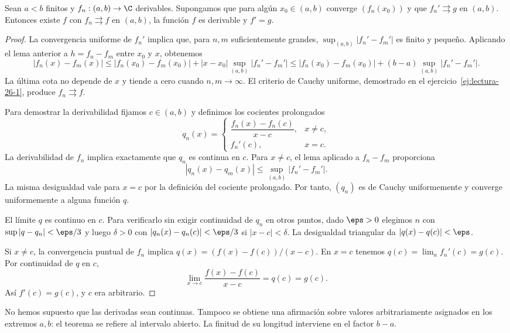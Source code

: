 \begin{teorema}\label{ch26:derivacion}
Sean $a<b$ finitos y $f_n:(a,b)\to\C$ derivables. Supongamos que para algún $x_0\in(a,b)$ converge $(f_n(x_0))$ y que $f_n'\rightrightarrows g$ en $(a,b)$. Entonces existe $f$ con $f_n\rightrightarrows f$ en $(a,b)$, la función $f$ es derivable y $f'=g$.
\end{teorema}
\begin{proof}
La convergencia uniforme de $f_n'$ implica que, para $n,m$ suficientemente grandes, $\sup_{(a,b)}|f_n'-f_m'|$ es finito y pequeño. Aplicando el lema anterior a $h=f_n-f_m$ entre $x_0$ y $x$, obtenemos
\[
 |f_n(x)-f_m(x)|
 \le |f_n(x_0)-f_m(x_0)|+|x-x_0|\sup_{(a,b)}|f_n'-f_m'|
 \le |f_n(x_0)-f_m(x_0)|+(b-a)\sup_{(a,b)}|f_n'-f_m'|.
\]
La última cota no depende de $x$ y tiende a cero cuando $n,m\to\infty$. El criterio de Cauchy uniforme, demostrado en el ejercicio~\ref{ej:lectura-26-1}, produce $f_n\rightrightarrows f$.

Para demostrar la derivabilidad fijamos $c\in(a,b)$ y definimos los cocientes prolongados
\[
 q_n(x)=\begin{cases}
 \dfrac{f_n(x)-f_n(c)}{x-c},&x\ne c,\\[4pt]
 f_n'(c),&x=c.
 \end{cases}
\]
La derivabilidad de $f_n$ implica exactamente que $q_n$ es continua en $c$. Para $x\ne c$, el lema aplicado a $f_n-f_m$ proporciona
\[
 |q_n(x)-q_m(x)|\le\sup_{(a,b)}|f_n'-f_m'|.
\]
La misma desigualdad vale para $x=c$ por la definición del cociente prolongado. Por tanto, $(q_n)$ es de Cauchy uniformemente y converge uniformemente a alguna función $q$.

El límite $q$ es continuo en $c$. Para verificarlo sin exigir continuidad de $q_n$ en otros puntos, dado $\eps>0$ elegimos $n$ con $\sup|q-q_n|<\eps/3$ y luego $\delta>0$ con $|q_n(x)-q_n(c)|<\eps/3$ si $|x-c|<\delta$. La desigualdad triangular da $|q(x)-q(c)|<\eps$.

Si $x\ne c$, la convergencia puntual de $f_n$ implica
$q(x)=(f(x)-f(c))/(x-c)$. En $x=c$ tenemos
$q(c)=\lim_n f_n'(c)=g(c)$. Por continuidad de $q$ en $c$,
\[
 \lim_{x\to c}\frac{f(x)-f(c)}{x-c}=q(c)=g(c).
\]
Así $f'(c)=g(c)$, y $c$ era arbitrario.
\end{proof}

No hemos supuesto que las derivadas sean continuas. Tampoco se obtiene una afirmación sobre valores arbitrariamente asignados en los extremos $a,b$: el teorema se refiere al intervalo abierto. La finitud de su longitud interviene en el factor $b-a$.

